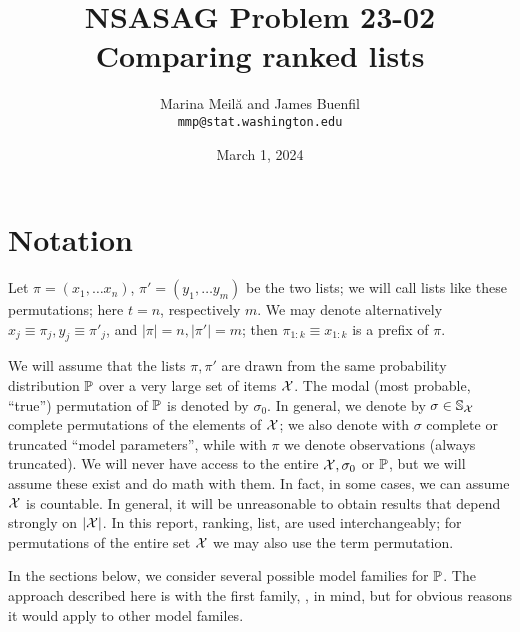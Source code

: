 \documentclass[10pt]{article}
\title{NSASAG Problem 23-02 Comparing ranked lists}
\author{Marina Meil\u{a} and James Buenfil\\{\tt mmp@stat.washington.edu}}
\date{March 1, 2024}
\begin{document}
\maketitle


\section{Notation}
\label{sec:notation}

Let $\pi=(x_1,\ldots x_n)$, $\pi'=(y_1,\ldots y_m)$ be the two lists; we will call lists like these \topt permutations; here $t=n$, respectively $m$. We may denote alternatively $x_j\equiv \pi_j, y_j\equiv \pi'_j$, and $|\pi|=n,|\pi'|=m$; then $\pi_{1:k}\equiv x_{1:k}$ is a prefix of $\pi$.%

We will assume that the lists $\pi,\pi'$ are drawn from the same probability
distribution ${\mathbb P}$ over a very large set of items ${\mathcal X}$. The modal
 (most probable, ``true'') permutation of ${\mathbb P}$ is
denoted by $\sigma_0$. In general, we denote by $\sigma\in {\mathbb S}_{{\mathcal X}}$
complete permutations of the elements of ${\mathcal X}$; we also denote with $\sigma$ complete or truncated ``model parameters'', while with $\pi$ we denote observations (always truncated). We will never have access to the entire ${\mathcal X},\sigma_0$ or ${\mathbb P}$, but we will assume these exist and do math with them. In fact, in some cases, we can assume ${\mathcal X}$ is countable. In general, it will be unreasonable to obtain results that depend strongly on $|{\mathcal X}|$. 
 In this report, ranking, list, are used interchangeably; for permutations of the entire set ${\mathcal X}$ we may also use the term permutation.

In the sections below, we consider several possible model families for ${\mathbb P}$. The approach described here is with the first family, \gmms, in mind, but for obvious reasons it would apply to other model familes.
\end{document}
